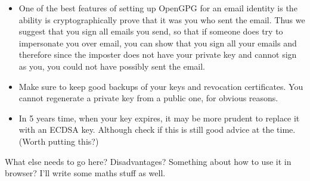 \begin{itemize}
    \item One of the best features of setting up OpenGPG for an email identity is the ability is cryptographically prove that it was you who sent the email. Thus we suggest that you sign all emails you send, so that if someone does try to impersonate you over email, you can show that you sign all your emails and therefore since the imposter does not have your private key and cannot sign as you, you could not have possibly sent the email.
    \item Make sure to keep good backups of your keys and revocation certificates. You cannot regenerate a private key from a public one, for obvious reasons.
    \item In 5 years time, when your key expires, it may be more prudent to replace it with an ECDSA key. Although check if this is still good advice at the time. (Worth putting this?)
\end{itemize}

What else needs to go here? Disadvantages? Something about how to use it in browser? I'll write some maths stuff as well.


